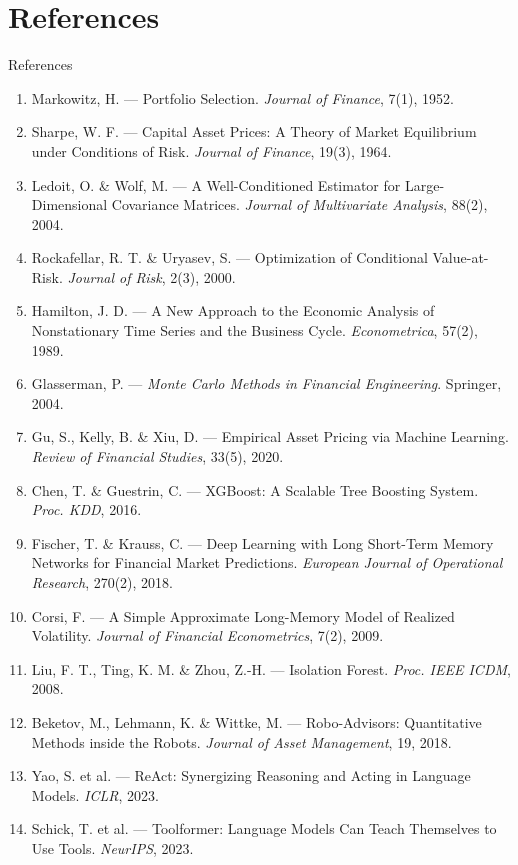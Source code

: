 \documentclass[aspectratio=169,11pt]{beamer}
\begin{document}
\section{References}
\begin{frame}{References}
  \vspace{0.05cm}
  \scriptsize
  \begin{enumerate}\setlength{\itemsep}{1.5pt}
    \item Markowitz, H. --- Portfolio Selection. \emph{Journal of Finance}, 7(1), 1952.
    \item Sharpe, W. F. --- Capital Asset Prices: A Theory of Market Equilibrium under Conditions of Risk. \emph{Journal of Finance}, 19(3), 1964.
    \item Ledoit, O. \& Wolf, M. --- A Well-Conditioned Estimator for Large-Dimensional Covariance Matrices. \emph{Journal of Multivariate Analysis}, 88(2), 2004.
    \item Rockafellar, R. T. \& Uryasev, S. --- Optimization of Conditional Value-at-Risk. \emph{Journal of Risk}, 2(3), 2000.
    \item Hamilton, J. D. --- A New Approach to the Economic Analysis of Nonstationary Time Series and the Business Cycle. \emph{Econometrica}, 57(2), 1989.
    \item Glasserman, P. --- \emph{Monte Carlo Methods in Financial Engineering}. Springer, 2004.
    \item Gu, S., Kelly, B. \& Xiu, D. --- Empirical Asset Pricing via Machine Learning. \emph{Review of Financial Studies}, 33(5), 2020.
    \item Chen, T. \& Guestrin, C. --- XGBoost: A Scalable Tree Boosting System. \emph{Proc. KDD}, 2016.
    \item Fischer, T. \& Krauss, C. --- Deep Learning with Long Short-Term Memory Networks for Financial Market Predictions. \emph{European Journal of Operational Research}, 270(2), 2018.
    \item Corsi, F. --- A Simple Approximate Long-Memory Model of Realized Volatility. \emph{Journal of Financial Econometrics}, 7(2), 2009.
    \item Liu, F. T., Ting, K. M. \& Zhou, Z.-H. --- Isolation Forest. \emph{Proc. IEEE ICDM}, 2008.
    \item Beketov, M., Lehmann, K. \& Wittke, M. --- Robo-Advisors: Quantitative Methods inside the Robots. \emph{Journal of Asset Management}, 19, 2018.
    \item Yao, S. et al. --- ReAct: Synergizing Reasoning and Acting in Language Models. \emph{ICLR}, 2023.
    \item Schick, T. et al. --- Toolformer: Language Models Can Teach Themselves to Use Tools. \emph{NeurIPS}, 2023.
  \end{enumerate}
\end{frame}
\end{document}

